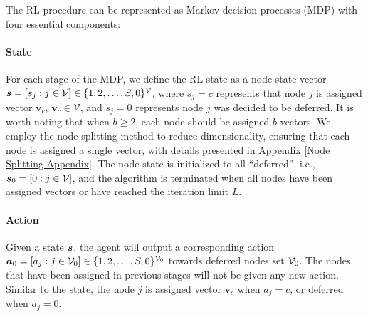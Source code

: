 \documentclass[a4paper,journal]{IEEEtran}
\def\v {\mathbf{v}}
\begin{document}
The RL procedure can be represented as Markov decision processes (MDP) with four essential components:

\paragraph{State}
For each stage of the MDP, we define the RL state as a node-state vector ${\bm{s}} = [s_j:j \in {\mathcal{V}}]\in \{1,2,\dots,S,0\}^{{\mathcal{V}}}$, where $s_j = c$ represents that node $j$ is assigned vector $\v_c$, $\v_c \in \mathcal{V}$, and $s_j = 0$ represents node $j$ was decided to be deferred. It is worth noting that when $b \geq 2$, each node should be assigned $b$ vectors. We employ the node splitting method to reduce dimensionality, ensuring that each node is assigned a single vector, with details presented in Appendix \ref{Node Splitting Appendix}. The node-state is initialized to all ``deferred'', i.e., ${\bm{s}}_0 = [0:j \in {\mathcal{V}}]$, and the algorithm is terminated when all nodes have been assigned vectors or have reached the iteration limit $L$.

\paragraph{Action}
Given a state ${\bm{s}}$, the agent will output a corresponding action ${\bm{a}}_0 = [a_j:j \in {\mathcal{V}}_0]\in \{1,2,\dots,S,0\}^{{\mathcal{V}}_0}$ towards deferred nodes set ${\mathcal{V}}_0$. The nodes that have been assigned in previous stages will not be given any new action. Similar to the state, the node $j$ is assigned vector $\v_c$ when $a_j = c$, or deferred when $a_j = 0$.
\end{document}

